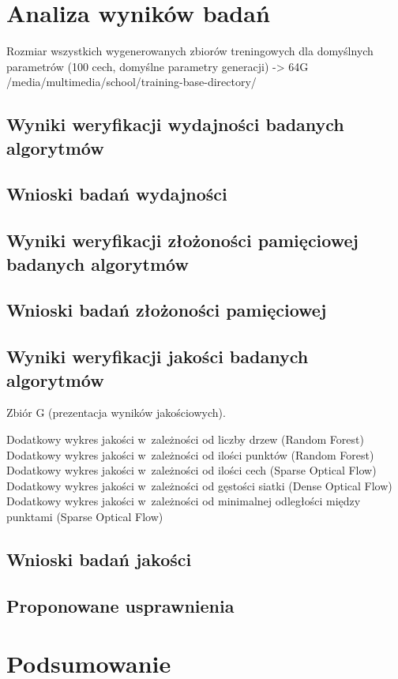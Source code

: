 \chapter{Analiza wyników badań}\label{Chapter_AnalizaRezultatow}

  Rozmiar wszystkich wygenerowanych zbiorów treningowych dla domyślnych parametrów (100 cech, domyślne parametry generacji) -> 64G /media/multimedia/school/training-base-directory/

  \section{Wyniki weryfikacji wydajności badanych algorytmów}\label{Section_Performance}

  \section{Wnioski badań wydajności}\label{Section_PerformanceWnioski}

  \section{Wyniki weryfikacji złożoności pamięciowej badanych algorytmów}\label{Section_MemoryPerformance}

  \section{Wnioski badań złożoności pamięciowej}\label{Section_MemoryPerformanceWnioski}

  \section{Wyniki weryfikacji jakości badanych algorytmów}\label{Section_Quality}

  Zbiór G (prezentacja wyników jakościowych).

  Dodatkowy wykres jakości w~zależności od liczby drzew (Random Forest)
  Dodatkowy wykres jakości w~zależności od ilości punktów (Random Forest)
  Dodatkowy wykres jakości w~zależności od ilości cech (Sparse Optical Flow)
  Dodatkowy wykres jakości w~zależności od gęstości siatki (Dense Optical Flow)
  Dodatkowy wykres jakości w~zależności od minimalnej odległości między punktami (Sparse Optical Flow)

  \section{Wnioski badań jakości}\label{Section_QualityWnioski}

  \section{Proponowane usprawnienia}\label{Section_Usprawnienia}

\chapter{Podsumowanie}\label{Section_Podsumowanie}